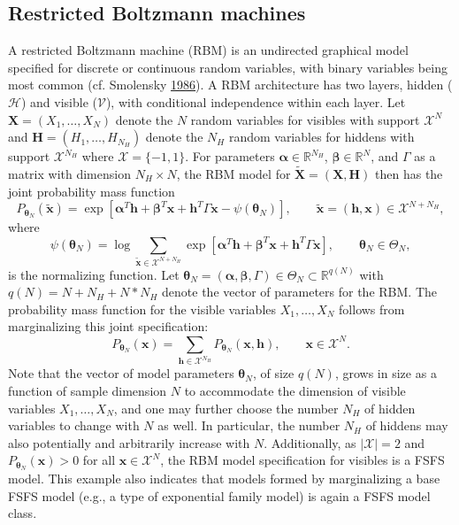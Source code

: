\documentclass[12pt]{article}
\theoremstyle{definition}
\begin{document}
\subsection{Restricted Boltzmann
machines}\label{restricted-boltzmann-machines}

A restricted Boltzmann machine (RBM) is an undirected graphical model
specified for discrete or continuous random variables, with binary
variables being most common (cf. Smolensky
\protect\hyperlink{ref-smolensky1986information}{1986}). A RBM
architecture has two layers, hidden (\(\mathcal{H}\)) and visible
(\(\mathcal{V}\)), with conditional independence within each layer. Let
\(\boldsymbol X=(X_1,\ldots,X_N)\) denote the \(N\) random variables for
visibles with support \(\mathcal{X}^N\) and
\(\boldsymbol H=(H_1,\ldots,H_{N_H})\) denote the \(N_H\) random
variables for hiddens with support \(\mathcal{X}^{N_H}\) where
\(\mathcal{X} = \{-1,1\}\). For parameters
\(\boldsymbol \alpha \in \mathbb{R}^{N_H}\),
\(\boldsymbol \beta \in \mathbb{R}^N\), and \(\Gamma\) as a matrix with
dimension \(N_H \times N\), the RBM model for
\(\tilde{\boldsymbol X}=(\boldsymbol X,\boldsymbol H)\) then has the
joint probability mass function \[
P_{\boldsymbol \theta_N} (\tilde{\boldsymbol x}) = \exp\left[ \boldsymbol \alpha^T \boldsymbol h + \boldsymbol \beta^T \boldsymbol x + \boldsymbol h^T \Gamma \boldsymbol x - \psi(\boldsymbol \theta_N)\right], \qquad \tilde{\boldsymbol x} = (\boldsymbol h, \boldsymbol x) \in \mathcal{X}^{N+N_H},
\] where \[
\psi(\boldsymbol \theta_N) = \log \sum_{\tilde{\boldsymbol x} \in \mathcal{X}^{N + N_H}} \exp\left[ \boldsymbol \alpha^T \boldsymbol h + \boldsymbol \beta^T \boldsymbol x + \boldsymbol h^T \Gamma \boldsymbol x\right], \qquad \boldsymbol \theta_N \in \Theta_N,
\] is the normalizing function. Let
\(\boldsymbol \theta_N = (\boldsymbol \alpha, \boldsymbol \beta,\Gamma) \in \Theta_N \subset \mathbb{R}^{q(N)}\)
with \(q(N) = N + N_H + N*N_H\) denote the vector of parameters for the
RBM. The probability mass function for the visible variables
\(X_1, \dots, X_N\) follows from marginalizing this joint specification:
\[
P_{\boldsymbol \theta_N} (\boldsymbol x) = \sum\limits_{\boldsymbol h \in \mathcal{X}^{N_H}} P_{\boldsymbol \theta_N} (\boldsymbol x, \boldsymbol h), \qquad \boldsymbol x \in \mathcal{X}^N.
\] Note that the vector of model parameters \(\boldsymbol \theta_N\), of
size \(q(N)\), grows in size as a function of sample dimension \(N\) to
accommodate the dimension of visible variables \(X_1, \dots, X_N\), and
one may further choose the number \(N_H\) of hidden variables to change
with \(N\) as well. In particular, the number \(N_H\) of hiddens may
also potentially and arbitrarily increase with \(N\). Additionally, as
\(|\mathcal{X}| = 2\) and
\(P_{\boldsymbol \theta_N}(\boldsymbol x) > 0\) for all
\(\boldsymbol x \in \mathcal{X}^N\), the RBM model specification for
visibles is a FSFS model. This example also indicates that models formed
by marginalizing a base FSFS model (e.g., a type of exponential family
model) is again a FSFS model class.
\end{document}
